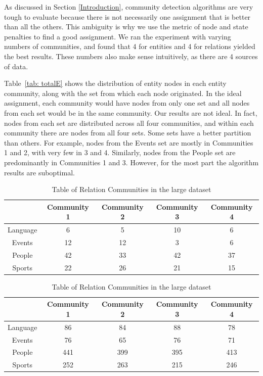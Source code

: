 \documentclass[12pt]{article}
\begin{document}
As discussed in Section \ref{Introduction}, community detection algorithms are
very tough to evaluate because there is not necessarily one assignment that is
better than all the others. This ambiguity is why we use the metric of node and
state penalties to find a good assignment. We ran the experiment with varying
numbers of communities, and found that 4 for entities and 4 for relations
yielded the best results. These numbers also make sense intuitively, as there
are 4 sources of data.

Table~\ref{tab: totalE} shows the distribution of entity nodes in each entity
community, along with the set from which each node originated. In the ideal
assignment, each community would have nodes from only one set and all nodes from
each set would be in the same community. Our results are not ideal. In fact,
nodes from each set are distributed across all four communities, and within each
community there are nodes from all four sets. Some sets have a better partition
than others. For example, nodes from the Events set are mostly in Communities 1
and 2, with very few in 3 and 4. Similarly, nodes from the People set are
predominantly in Communities 1 and 3. However, for the most part the algorithm
results are suboptimal.

\begin{table}[]
    \centering
    \begin{tabular}{|c||c|c|c|c|}
        \hline
        & Community 1 & Community 2 & Community 3 & Community 4 \\ \hline
        Language & 6 & 5 & 10 & 6 \\ \hline
        Events & 12 & 12 & 3 & 6 \\ \hline
        People & 42 & 33 & 42 & 37 \\ \hline
        Sports & 22 & 26 & 21 & 15 \\ \hline
    \end{tabular}
    \caption{Table of Entity Communities in the large dataset}
    \label{tab: totalE}

    \vspace{4ex}

    \begin{tabular}{|c||c|c|c|c|}
        \hline
        & Community 1 & Community 2 & Community 3 & Community 4 \\ \hline
        Language & 86 & 84 & 88 & 78 \\ \hline
        Events & 76 & 65 & 76  & 71 \\ \hline
        People & 441 & 399 & 395 & 413 \\ \hline
        Sports & 252 & 263 & 215 & 246 \\ \hline
    \end{tabular}
    \caption{Table of Relation Communities in the large dataset}
    \label{tab: totalR}

\end{table}
\end{document}
